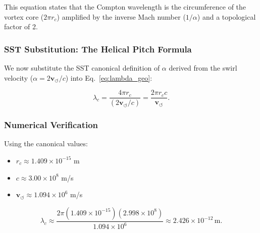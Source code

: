 \documentclass[10pt,reprint,aps,onecolumn,nofootinbib]{revtex4-2}
\begin{document}
            This equation states that the Compton wavelength is the circumference of
            the vortex core ($2\pi r_c$) amplified by the inverse Mach number ($1/\alpha$)
            and a topological factor of 2.

        \subsubsection*{SST Substitution: The Helical Pitch Formula}

            We now substitute the SST canonical definition of $\alpha$ derived from
            the swirl velocity ($\alpha = 2 \mathbf{v}_{\!\boldsymbol{\circlearrowleft}} / c$) into Eq.~\eqref{eq:lambda_geo}:

            \begin{equation}
                \lambda_c = \frac{4\pi r_c}{(2 \mathbf{v}_{\!\boldsymbol{\circlearrowleft}} / c)}
                = \frac{2\pi r_c c}{\mathbf{v}_{\!\boldsymbol{\circlearrowleft}}}.
                \label{eq:SST_Compton}
            \end{equation}

        \subsubsection*{Numerical Verification}

            Using the canonical values:
            \begin{itemize}
                \item $r_c \approx 1.409 \times 10^{-15}$ m
                \item $c \approx 3.00 \times 10^8$ m/s
                \item $\mathbf{v}_{\!\boldsymbol{\circlearrowleft}} \approx 1.094 \times 10^6$ m/s
            \end{itemize}

            \begin{equation}
                \lambda_c \approx \frac{2\pi (1.409 \times 10^{-15})(2.998 \times 10^8)}{1.094 \times 10^6}
                \approx 2.426 \times 10^{-12} \, \text{m}.
            \end{equation}
\end{document}
